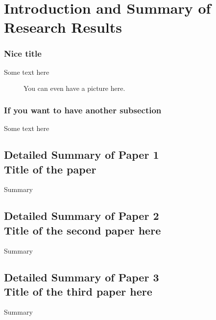 \chapter{Introduction and Summary of Research Results}
\label{ch:introduction}


\subsection*{Nice title}
%
Some text here


\begin{figure}
\begin{center}
\begin{minipage}{160mm}
\caption{You can even have a picture here. 
\label{fig:flash_crash}}
\end{minipage}
\end{center}
\end{figure}



\subsection*{If you want to have another subsection}
%
Some text here \citep{dacorogna2001extremal}


\section*{Detailed Summary of Paper 1\\ {\large Title of the paper}}
Summary 


\section*{Detailed Summary of Paper 2\\ {\large Title of the second paper here}}
Summary 


\section*{Detailed Summary of Paper 3\\ {\large Title of the third paper here}}
Summary 
